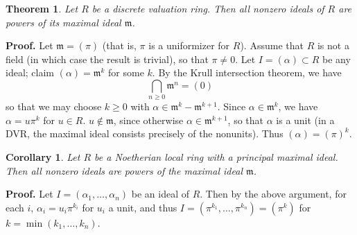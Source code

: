 \documentclass[12pt]{article}
\newcommand{\smm}{\mathfrak{m}}
\newtheorem{thm}{Theorem}
\newtheorem{cor}{Corollary}
\begin{document}
\begin{thm} Let $R$ be a discrete valuation ring. Then all nonzero ideals of $R$ are powers of its maximal ideal $\smm$.
\end{thm}

\textbf{Proof. } Let $\smm = (\pi)$ (that is, $\pi$ is a uniformizer for $R$). Assume that $R$ is not a field (in which case the result is trivial), so that $\pi\neq 0$. 
Let $I=(\alpha)\subset R$ be any ideal; claim $(\alpha)=\smm^k$ for some $k$. By the Krull intersection theorem, we have
\[\bigcap_{n\geq 0}\smm^n=(0)\]
so that we may choose $k\geq 0$ with $\alpha\in \smm^k-\smm^{k+1}$. Since $\alpha\in\smm^k$, we have $\alpha = u\pi^k$ for $u\in R$. $u\notin \smm$, since otherwise $\alpha\in\smm^{k+1}$, so that $\alpha$ is a unit (in a DVR, the maximal ideal consists precisely of the nonunits). Thus $(\alpha)=(\pi)^k$.

\begin{cor} Let $R$ be a Noetherian local ring with a principal maximal ideal. Then all nonzero ideals are powers of the maximal ideal $\smm$.
\end{cor}

\textbf{Proof. } Let $I=(\alpha_1,\ldots,\alpha_n)$ be an ideal of $R$. Then by the above argument, for each $i$, $\alpha_i = u_i\pi^{k_i}$ for $u_i$ a unit, and thus $I=(\pi^{k_1},\ldots,\pi^{k_n}) = (\pi^k)$ for $k=\min(k_1,\ldots,k_n)$.
\end{document}
